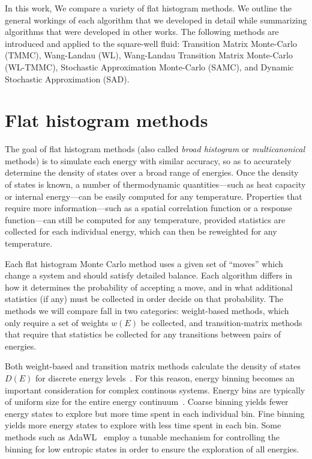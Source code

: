 \documentclass[letterpaper,twocolumn,amsmath,amssymb,pre,aps,10pt]{revtex4-1}
\begin{document}
In this work, We compare a variety of flat histogram
methods.  We outline the general workings of each algorithm that we
developed in detail while summarizing algorithms that were developed in other
works.  The following methods are introduced and applied to the
square-well fluid: Transition Matrix Monte-Carlo (TMMC), Wang-Landau
(WL), Wang-Landau Transition Matrix Monte-Carlo (WL-TMMC), Stochastic
Approximation Monte-Carlo (SAMC), and Dynamic Stochastic Approximation
(SAD).

\section{Flat histogram methods}\label{sec:histogram}

The goal of flat histogram methods (also called \emph{broad histogram}
or \emph{multicanonical} methods) is to simulate each energy with
similar accuracy, so as to accurately determine the density of states
over a broad range of energies.  Once the density of states is known,
a number of thermodynamic quantities---such as heat capacity or
internal energy---can be easily computed for any temperature.
Properties that require more information---such as a spatial
correlation function or a response function---can still be computed
for any temperature, provided statistics are collected for each
individual energy, which can then be reweighted for any temperature.

Each flat histogram Monte Carlo method uses a given set of ``moves''
which change a system and should satisfy detailed balance.  Each
algorithm differs in how it determines the probability of accepting a
move, and in what additional statistics (if any) must be collected in
order decide on that probability.  The methods we will compare fall in
two categories:  weight-based methods, which only require a set of
weights $w(E)$ be collected, and transition-matrix methods that
require that statistics be collected for any transitions between pairs
of energies.

{\color{red} Both weight-based and transition matrix methods calculate
the density of states $D(E)$ for discrete energy
levels~\cite{haber2018performance}. For this reason, energy binning
becomes an important consideration for complex continous systems.
Energy bins are typically of uniform size for the entire energy
continuum~\cite{fasnacht2004adaptive}. Coarse binning yields fewer
energy states to explore but more time spent in each individual bin.
Fine binning yields more energy states to explore with less time spent
in each bin. Some methods such as AdaWL~\cite{koh2013dynamically}
employ a tunable mechanism for controlling the binning for low entropic
states in order to ensure the exploration of all energies. }
\end{document}
